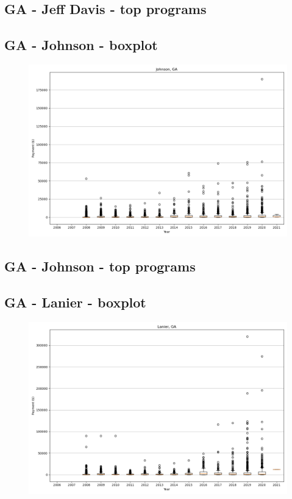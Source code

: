 \subsection*{GA - Jeff Davis - top programs}

\newpage
\subsection*{GA - Johnson - boxplot}
\begin{figure}[h]
\centering
\includegraphics[width=7in]{../output/boxplots/counties/Johnson-GA_boxplot.png}
\end{figure}


\subsection*{GA - Johnson - top programs}

\newpage
\subsection*{GA - Lanier - boxplot}
\begin{figure}[h]
\centering
\includegraphics[width=7in]{../output/boxplots/counties/Lanier-GA_boxplot.png}
\end{figure}


